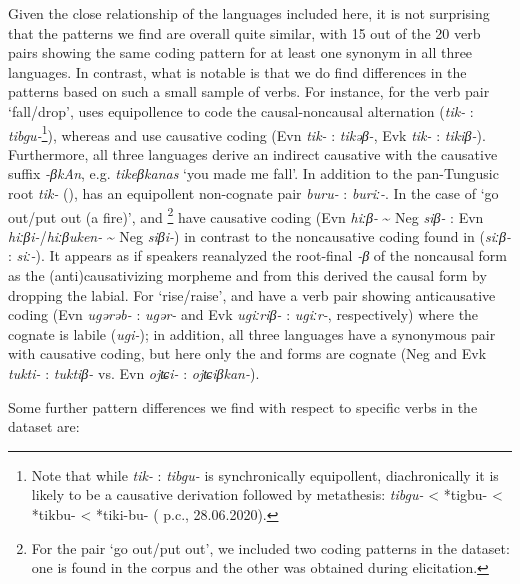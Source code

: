 \documentclass[output=paper,colorlinks,citecolor=brown]{langscibook}
\begin{document}
Given the close relationship of the languages included here, it is not surprising that the patterns we find are overall quite similar, with 15 out of the 20 verb pairs showing the same coding pattern for at least one synonym in all three languages. In contrast, what is notable is that we do find differences in the patterns based on such a small sample of verbs. For instance, for the verb pair ‘fall/drop’,  uses equipollence to code the causal-noncausal alternation (\textit{tik-} : \textit{tibgu-}\footnote{Note that while \textit{tik-} : \textit{tibgu-} is synchronically equipollent, diachronically it is likely to be a causative derivation followed by metathesis: \textit{tibgu-} < *tigbu- < *tikbu- < *tiki-bu- ( p.c., 28.06.2020).}), whereas  and  use causative coding (Evn \textit{tik-} : \textit{tikəβ-}, Evk \textit{tik-} : \textit{tikiβ-}). Furthermore, all three languages derive an indirect causative with the causative suffix \textit{-βkAn}, e.g.  \textit{tikeβkanas} ‘you made me fall’. In addition to the pan-Tungusic root \textit{tik-} (\citealt[87]{Sunik1962}),  has an equipollent non-cognate pair \textit{buru-} : \textit{buriː-}. In the case of ‘go out/put out (a fire)’,  and \footnote{For the  pair ‘go out/put out’, we included two coding patterns in the dataset: one is found in the corpus and the other was obtained during elicitation.} have causative coding (Evn \textit{hiːβ-} {\textasciitilde} Neg \textit{siβ-} : Evn \textit{hiːβi-}/\textit{hiːβuken-} {\textasciitilde} Neg \textit{siβi-}) in contrast to the noncausative coding found in  (\textit{siːβ-} : \textit{siː-}). It appears as if  speakers reanalyzed the root-final \textit{-β} of the noncausal form as the (anti)causativizing morpheme and from this derived the causal form by dropping the labial. For ‘rise/raise’,  and  have a verb pair showing anticausative coding (Evn \textit{ugərəb-} : \textit{ugər-} and Evk \textit{ugiːriβ-} : \textit{ugiːr-}, respectively) where the  cognate is labile (\textit{ugi-}); in addition, all three languages have a synonymous pair with causative coding, but here only the  and  forms are cognate (Neg and Evk \textit{tukti-} : \textit{tuktiβ-} vs. Evn \textit{ojʨi-} : \textit{ojʨiβkan-}).

Some further pattern differences we find with respect to specific verbs in the dataset are:
\end{document}
